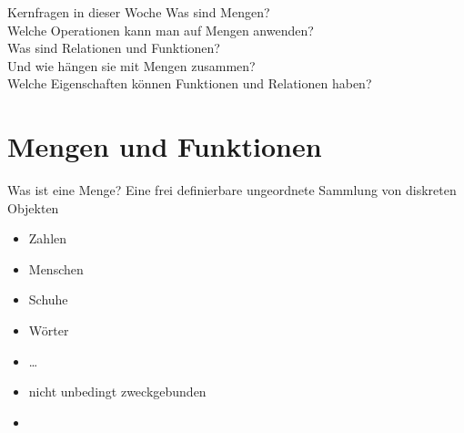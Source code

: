 \begin{frame}
  {Kernfragen in dieser Woche}
  \onslide<+->
  \onslide<+->
  \centering 
  \Large
  Was sind \alert{Mengen}?\\
  \Halbzeile
  \onslide<+->
  Welche Operationen kann man auf Mengen anwenden?\\
  \onslide<+->
  \Halbzeile
  Was sind \alert{Relationen} und \alert{Funktionen}?\\
  Und wie hängen sie mit Mengen zusammen?\\
  \onslide<+->
  \Halbzeile
  Welche Eigenschaften können Funktionen und Relationen haben?\\
  \Halbzeile
  \onslide<+->
\end{frame}

\section{Mengen und Funktionen}

\begin{frame}
  {Was ist eine Menge?}
  \onslide<+->
  \onslide<+->
  Eine \alert{frei definierbare ungeordnete Sammlung von diskreten Objekten}\\
  \begin{itemize}[<+->]
    \item Zahlen
    \item Menschen
    \item Schuhe
    \item Wörter
    \item \ldots
      \Halbzeile
    \item nicht unbedingt zweckgebunden
    \item {}
  \end{itemize}
\end{frame}

